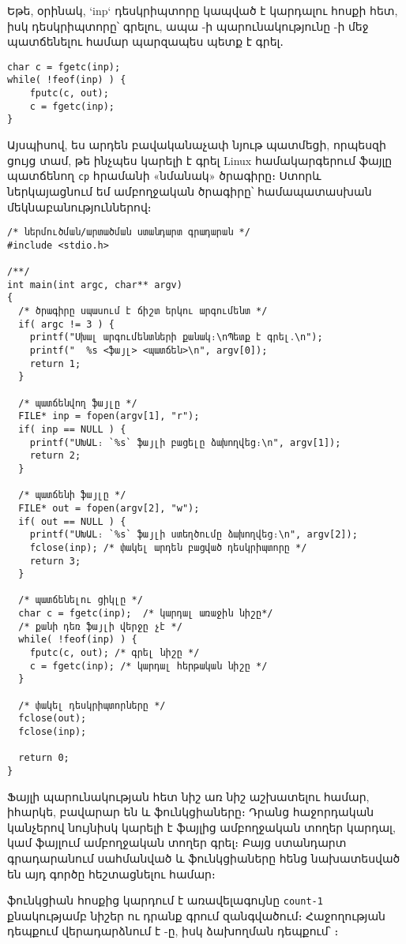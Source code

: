 Եթե, օրինակ, `inp` դեսկրիպտորը կապված է կարդալու հոսքի հետ,
իսկ  դեսկրիպտորը՝ գրելու, ապա -ի
պարունակությունը -ի մեջ պատճենելու համար պարզապես
պետք է գրել․

\begin{Verbatim}
char c = fgetc(inp);
while( !feof(inp) ) {
    fputc(c, out);
    c = fgetc(inp);
}
\end{Verbatim}

Այսպիսով, ես արդեն բավականաչափ նյութ պատմեցի, որպեսզի ցույց
տամ, թե ինչպես կարելի է գրել Linux համակարգերում ֆայլը պատճենող
\texttt{cp} հրամանի «նմանակ» ծրագիրը։ Ստորև ներկայացնում եմ
ամբողջական ծրագիրը՝ համապատասխան մեկնաբանություններով։

\begin{Verbatim}
/* ներմուծման/արտածման ստանդարտ գրադարան */
#include <stdio.h>

/**/
int main(int argc, char** argv)
{
  /* ծրագիրը սպասում է ճիշտ երկու արգումենտ */
  if( argc != 3 ) {
    printf("Սխալ արգումենտների քանակ։\nՊետք է գրել․\n");
    printf("  %s <ֆայլ> <պատճեն>\n", argv[0]);
    return 1;
  }

  /* պատճենվող ֆայլը */
  FILE* inp = fopen(argv[1], "r");
  if( inp == NULL ) {
    printf("ՍԽԱԼ։ `%s` ֆայլի բացելը ձախողվեց։\n", argv[1]);
    return 2;
  }

  /* պատճենի ֆայլը */
  FILE* out = fopen(argv[2], "w");
  if( out == NULL ) {
    printf("ՍԽԱԼ։ `%s` ֆայլի ստեղծումը ձախողվեց։\n", argv[2]);
    fclose(inp); /* փակել արդեն բացված դեսկրիպտորը */
    return 3;
  }

  /* պատճենելու ցիկլը */
  char c = fgetc(inp);  /* կարդալ առաջին նիշը*/
  /* քանի դեռ ֆայլի վերջը չէ */
  while( !feof(inp) ) {
    fputc(c, out); /* գրել նիշը */
    c = fgetc(inp); /* կարդալ հերթական նիշը */
  }

  /* փակել դեսկրիպտորները */
  fclose(out);
  fclose(inp);

  return 0;
}
\end{Verbatim}

Ֆայլի պարունակության հետ նիշ առ նիշ աշխատելու համար, իհարկե,
բավարար են  և  ֆունկցիաները։ Դրանց
հաջորդական կանչերով նույնիսկ կարելի է ֆայլից ամբողջական տողեր
կարդալ, կամ ֆայլում ամբողջական տողեր գրել։ Բայց ստանդարտ
գրադարանում սահմանված  և  ֆունկցիաները
հենց նախատեսված են այդ գործը հեշտացնելու համար։

 ֆունկցիան  հոսքից կարդում է
առավելագույնը \texttt{count-1} քնակությամբ նիշեր ու դրանք
գրում  զանգվածում։ Հաջողության դեպքում
վերադարձնում է -ը, իսկ ձախողման դեպքում՝
։

